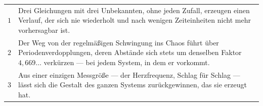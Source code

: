 \begin{merksatz}
\begin{center}
{\small
\renewcommand{\arraystretch}{1.55}
\begin{tabular}{@{}P{1.0cm}P{7.4cm}@{}}
\toprule
$1$ & Drei Gleichungen mit drei Unbekannten, ohne jeden Zufall, erzeugen einen Verlauf, der sich nie wiederholt und nach wenigen Zeiteinheiten nicht mehr vorhersagbar ist. \\
$2$ & Der Weg von der regelmäßigen Schwingung ins Chaos führt über Periodenverdopplungen, deren Abstände sich stets um denselben Faktor $4{,}669\ldots$ verkürzen --- bei jedem System, in dem er vorkommt. \\
$3$ & Aus einer einzigen Messgröße --- der Herzfrequenz, Schlag für Schlag --- lässt sich die Gestalt des ganzen Systems zurückgewinnen, das sie erzeugt hat. \\
\bottomrule
\end{tabular}}
\end{center}

\begin{center}
\begin{minipage}{0.88\textwidth}
\end{minipage}
\end{center}
\end{merksatz}


